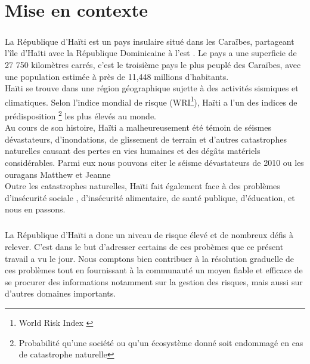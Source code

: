 \chapter*{Mise en contexte}


	\paragraph{} La R\'epublique d'Ha\"iti est un pays insulaire situ\'e dans les Cara\"ibes, partageant l'\^ile d'Ha\"iti avec la R\'epublique Dominicaine \`a l'est . Le pays a une superficie de 27 750 kilom\`etres carr\'es\cite{htsuperficie}, c'est le troisi\`eme pays le plus peupl\'e des Cara\"ibes, avec une population estim\'ee \`a pr\`es de 11,448 millions d'habitants.\cite{htpopulationA}\cite{htpopulationB} \\
	Ha\"iti se trouve dans une r\'egion g\'eographique sujette \`a des activit\'es sismiques et climatiques. Selon l'indice mondial de risque (WRI\footnote{World Risk Index \cite{WRI}}), Ha\"iti a l'un des indices de pr\'edisposition \footnote{Probabilit\'e qu'une soci\'et\'e ou qu'un \'ecosyst\`eme donn\'e soit endommag\'e en cas de catastrophe naturelle} les plus \'elev\'es au monde.\cite{RisqueEnHaiti}  \\
	Au cours de son histoire, Ha\"iti a malheureusement \'et\'e t\'emoin de s\'eismes d\'evastateurs, d'inondations, de glissement de terrain et d'autres catastrophes naturelles causant des pertes en vies humaines et des d\'eg\^ats mat\'eriels consid\'erables. Parmi eux nous pouvons citer le s\'eisme d\'evastateurs de 2010\cite{seisme2010} ou les ouragans Matthew \cite{ouraganMatthew1}\cite{ouraganMatthew2} et Jeanne \cite{ouraganJeanne} \\
	Outre les catastrophes naturelles, Ha\"iti fait \'egalement  face \`a des probl\`emes d'ins\'ecurit\'e sociale\cite{insecuriteSociale1} \cite{insecuriteSociale2}, d'ins\'ecurit\'e alimentaire\cite{insecuriteAlimentaire}, de sant\'e publique\cite{sante}, d'\'education\cite{education1}, et nous en passons.


	\paragraph{} La R\'epublique d'Ha\"iti a donc un niveau  de risque \'elev\'e et de nombreux d\'efis \`a relever. C'est dans le but d'adresser certains de ces prob\`emes que ce pr\'esent travail a vu le jour. Nous comptons bien contribuer \`a la r\'esolution graduelle de ces probl\`emes tout en fournissant \`a la communaut\'e un moyen fiable et efficace de se procurer des informations notamment sur la gestion des risques, mais aussi sur d'autres domaines importants.






